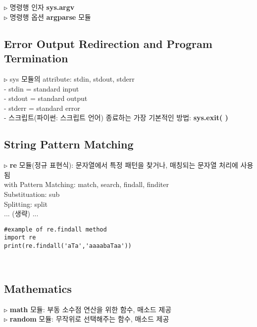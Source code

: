 \documentclass[11pt,a4paper]{article}
\begin{document}
\begin{spacing}{1.5}
\texttt{▷} 명령행 인자 \textbf{sys.argv}\\

\texttt{▷} 명령행 옵션 \textbf{argparse} 모듈\\

\subsection{\Large\textbf{Error Output Redirection and Program Termination}}
\texttt{▷} sys 모듈의 attribute: stdin, stdout, stderr\\
- stdin = standard input\\
- stdout = standard output\\
- stderr = standard error\\

- 스크립트(파이썬: 스크립트 언어) 종료하는 가장 기본적인 방법: \textbf{sys.exit( )}\\

\subsection{\Large\textbf{String Pattern Matching}}
\texttt{▷} \textbf{re} 모듈(정규 표현식): 문자열에서 특정 패턴을 찾거나, 매칭되는 문자열 처리에 사용됨\\
with Pattern Matching: match, search, findall, finditer\\
\hspace*{2em}Substituation: sub\\
\hspace*{2em}Splitting: split\\

... (생략) ...
\begin{lstlisting}[label={list:first}]
#example of re.findall method
import re
print(re.findall('aTa','aaaabaTaa'))
\end{lstlisting}\\


\subsection{\Large\textbf{Mathematics}}
\texttt{▷} \textbf{math} 모듈: 부동 소수점 연산을 위한 함수, 매소드 제공\\

\texttt{▷} \textbf{random} 모듈: 무작위로 선택해주는 함수, 매소드 제공\\


\end{spacing}
\end{document}
